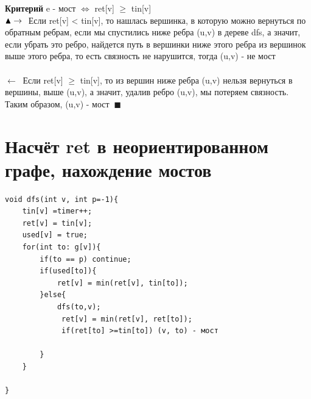 \textbf{Критерий}
e - мост $\Longleftrightarrow$ ret[v] $\geq$ tin[v]
\\
$\blacktriangle \\ \rightarrow \ $ Если ret[v] < tin[v], то нашлась вершинка, в которую можно вернуться по обратным ребрам, если мы спустились ниже ребра (u,v) в дереве dfs, а значит, если убрать это ребро, найдется путь в вершинки ниже этого ребра из вершинок выше этого ребра, то есть связность не нарушится, тогда (u,v) - не мост\\ \\
 $\leftarrow \ $ Если ret[v] $\geq$ tin[v], то из вершин ниже ребра  (u,v) нельзя вернуться в вершины, выше (u,v), а значит, удалив ребро (u,v), мы потеряем связность. Таким образом, (u,v) - мост $\ \blacksquare$
\setcounter{section}{35}
\section{Насчёт ret в неориентированном графе, нахождение мостов}
\begin{verbatim}
void dfs(int v, int p=-1){
    tin[v] =timer++;
    ret[v] = tin[v];
    used[v] = true;
    for(int to: g[v]){
        if(to == p) continue;
        if(used[to]){
            ret[v] = min(ret[v], tin[to]);
        }else{
            dfs(to,v);
             ret[v] = min(ret[v], ret[to]);
             if(ret[to] >=tin[to]) (v, to) - мост
            
        }
    }

}
\end{verbatim}
